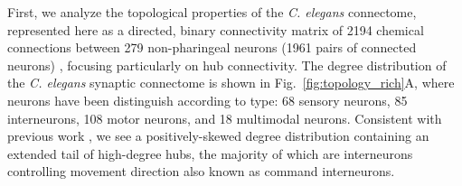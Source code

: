 \documentclass[10pt,letterpaper]{article}
\begin{document}
First, we analyze the topological properties of the \emph{C. elegans} connectome, represented here as a directed, binary connectivity matrix of 2194 chemical connections between 279 non-pharingeal neurons (1961 pairs of connected neurons) \cite{Varshney2011}, focusing particularly on hub connectivity.
The degree distribution of the \emph{C. elegans} synaptic connectome is shown in Fig.~\ref{fig:topology_rich}A, where neurons have been distinguish according to type: 68 sensory neurons, 85 interneurons, 108 motor neurons, and 18 multimodal neurons.
Consistent with previous work \cite{Towlson:2013gf}, we see a positively-skewed degree distribution containing an extended tail of high-degree hubs, the majority of which are interneurons controlling movement direction also known as command interneurons.

\end{document}
